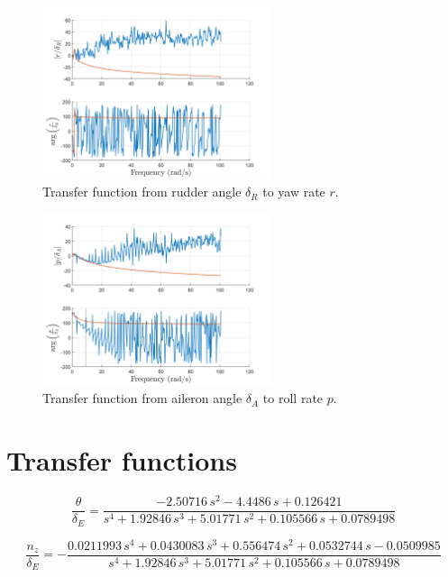 \documentclass{article}
\begin{document}
\begin{figure}[H]
      \centering
      \includegraphics[width=0.6\textwidth]{rudder_to_yawrate.png}
      \caption{Transfer function from rudder angle $\delta_R$ to yaw rate $r$.}
      \label{fig:rudder_to_yawrate}
\end{figure}
  
\begin{figure}[H]
      \centering
      \includegraphics[width=0.6\textwidth]{aileron_to_rollrate.png}
      \caption{Transfer function from aileron angle $\delta_A$ to roll rate $p$.}
      \label{fig:aileron_to_rollrate}
\end{figure}

\section{Transfer functions}

\begin{equation}
    \frac{\theta}{\delta_E} =
    \frac{-2.50716\,s^2-4.4486\,s+0.126421}{s^4+1.92846\,s^3+5.01771\,s^2+0.105566\,s+0.0789498}
\end{equation}

\begin{equation}
    \frac{n_z}{\delta_E} =
    -\frac{0.0211993\,s^4+0.0430083\,s^3+0.556474\,s^2+0.0532744\,s-0.0509985}{s^4+1.92846\,s^3+5.01771\,s^2+0.105566\,s+0.0789498}
\end{equation}
\end{document}
